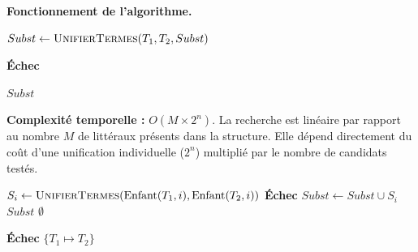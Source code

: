 \documentclass[11pt]{article}
\newenvironment{paraph}[1]{%
  \medskip
  \noindent\textbf{#1.}\quad

  \vspace{0.2cm}
}{%
  \medskip
}
\begin{document}
\begin{paraph}{Fonctionnement de l'algorithme}
\begin{algorithm}[H]
\begin{algorithmic}[1]
                    \State{}
                    \State$Subst \gets \Call{UnifierTermes}{T_1, T_2, Subst}$ 
                    
                        \State\Return\textbf{Échec} 
                    \EndIf
                \EndFor
                
                \State\Return$Subst$ 
            \EndProcedure

        \end{algorithmic}
    \end{algorithm}
    \textbf{Complexité temporelle :} $O(M \times 2^n)$. 
    La recherche est linéaire par rapport au nombre $M$ de littéraux présents dans la structure. Elle dépend directement du coût d'une unification individuelle ($2^n$) multiplié par le nombre de candidats testés.

    \begin{algorithm}[H]
    \footnotesize
    \caption{Unification de deux termes (Robinson)}
    \label{alg:unification_termes}
    \begin{algorithmic}[1]
        
            
            \vspace{0.1cm}
            \State{}
                    \State{}
                        \State$S_i \gets \Call{UnifierTermes}{\text{Enfant}(T_1, i), \text{Enfant}(T_2, i)}$
                            \State\Return\textbf{Échec}
                        \EndIf
                        \State$Subst \gets Subst \cup S_i$
                    \EndFor
                    \State\Return$Subst$
                \Else
                    \State\Return$\emptyset$ 
                \EndIf
            \EndIf
            
            \vspace{0.1cm}
            \State{}
                    \State\Return\textbf{Échec} 
                \EndIf
                \State\Return$\{T_1 \mapsto T_2\}$
            \EndIf
            

\end{algorithmic}
\end{algorithm}
\end{paraph}
\end{document}
